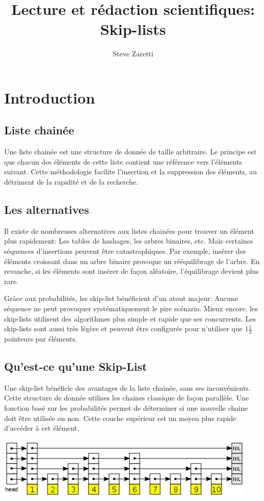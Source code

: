\documentclass[a4paper, 12pt]{article}
\title{Lecture et rédaction scientifiques: \\Skip-lists }
\author{Steve Zaretti}
\begin{document}
	
	\maketitle
	\newpage
	\tableofcontents
	\newpage
	
	\section{Introduction}
	\subsection{Liste chainée}
	Une liste chainée est une structure de donnée de taille arbitraire. Le principe est que chacun des éléments de cette liste contient une référence vers l'éléments suivant. Cette méthodologie facilite l'insertion et la suppression des éléments, au détriment de la rapidité et de la recherche.
	\subsection{Les alternatives}
	Il existe de nombreuses alternatives aux listes chainées pour trouver un élément plus rapidement: Les tables de hashages, les arbres binaires, etc. Mais certaines séquences d'insertions peuvent être catastrophiques. Par exemple, insérer des éléments croissant dans un arbre binaire provoque un rééquilibrage de l'arbre. En revanche, si les éléments sont insérer de façon aléatoire, l'équilibrage devient plus rare.

	Grâce aux probabilités, les \og skip-list \fg{} bénéficient d'un atout majeur: Aucune séquence ne peut provoquer systématiquement le pire scénario. Mieux encore, les skip-lists utilisent des algorithmes plus simple et rapide que ses concurrents. Les skip-lists sont aussi très légère et peuvent être configurée pour n'utiliser que $1\frac{1}{3}$ pointeurs par éléments.
	
	\subsection{Qu'est-ce qu'une Skip-List}
	 Une skip-list bénéficie des avantages de la liste chainée, sans ses inconvénients. Cette structure de donnée utilises les chaines classique de façon parallèle. Une fonction basé sur les probabilités permet de déterminer si une nouvelle chaine doit être utilisée ou non. Cette couche supérieur est un moyen plus rapide d'accéder à cet élément.
	 \begin{center}
		\includegraphics[width=\textwidth]{img/SkipList}
	\end{center}
	
\end{document}
